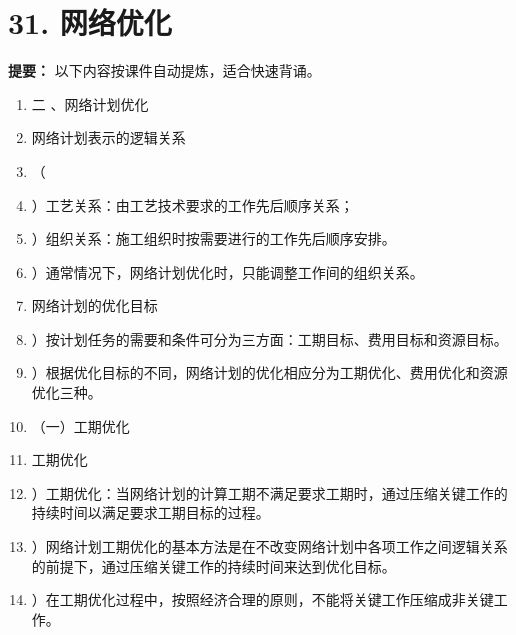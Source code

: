 \documentclass[UTF8,fontset=fandol,11pt]{ctexart}
\begin{document}
\newpage

\section*{31. 网络优化}


\begin{mainbox}

\textbf{提要：} 以下内容按课件自动提炼，适合快速背诵。

\end{mainbox}

\begin{enumerate}[label=\arabic*.]

\item 二 、网络计划优化

\item 网络计划表示的逻辑关系

\item （

\item ）工艺关系：由工艺技术要求的工作先后顺序关系；

\item ）组织关系：施工组织时按需要进行的工作先后顺序安排。

\item ）通常情况下，网络计划优化时，只能调整工作间的组织关系。

\item 网络计划的优化目标

\item ）按计划任务的需要和条件可分为三方面：工期目标、费用目标和资源目标。

\item ）根据优化目标的不同，网络计划的优化相应分为工期优化、费用优化和资源优化三种。

\item （一）工期优化

\item 工期优化

\item ）工期优化：当网络计划的计算工期不满足要求工期时，通过压缩关键工作的持续时间以满足要求工期目标的过程。

\item ）网络计划工期优化的基本方法是在不改变网络计划中各项工作之间逻辑关系的前提下，通过压缩关键工作的持续时间来达到优化目标。

\item ）在工期优化过程中，按照经济合理的原则，不能将关键工作压缩成非关键工作。


\end{enumerate}
\end{document}
